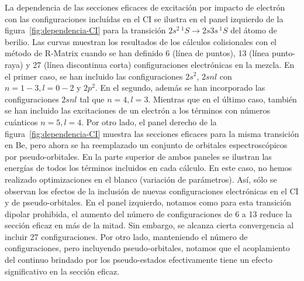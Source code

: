 La dependencia de las secciones eficaces de excitación por impacto de 
electrón con las configuraciones incluídas en el CI se ilustra en el 
panel izquierdo de la figura~\ref{fig:dependencia-CI} para la transición 
$2s^2\,^1S\rightarrow 2s3s\,^1S$ del átomo de berilio. Las curvas 
muestran los resultados de los cálculos colisionales con el método de 
R-Matrix cuando se han definido 6 (línea de puntos), 13 (línea 
punto-raya) y 27 (línea discontinua corta) configuraciones electrónicas 
en la mezcla. En el primer caso, se han incluido las configuraciones 
$2s^2$, $2snl$ con $n=1-3,l=0-2$ y $2p^2$. En el segundo, además se han 
incorporado las configuraciones $2snl$ tal que $n=4,l=3$. Mientras que en 
el último caso, también se han incluido las excitaciones de un electrón a 
los términos con números cuánticos $n=5,l=4$. Por otro lado, el panel 
derecho de la figura~\ref{fig:dependencia-CI} muestra las secciones 
eficaces para la misma transición en Be, pero ahora se ha reemplazado un 
conjunto de orbitales espectroscópicos por pseudo-orbitales. En la parte 
superior de ambos paneles se ilustran las energías de todos los términos 
incluidos en cada cálculo. En este caso, no hemos realizado 
optimizaciones en el blanco (variación de parámetros). Así, sólo se 
observan los efectos de la inclusión de nuevas configuraciones 
electrónicas en el CI y de pseudo-orbitales. En el panel izquierdo, 
notamos como para esta transición dipolar prohibida, el aumento del 
número de configuraciones de 6 a 13 reduce la sección eficaz en más de la 
mitad. Sin embargo, se alcanza cierta convergencia al incluir 27 
configuraciones. Por otro lado, manteniendo el número de configuraciones,
pero incluyendo pseudo-orbitales, notamos que el acoplamiento del 
continuo brindado por los pseudo-estados efectivamente tiene un efecto 
significativo en la sección eficaz.

